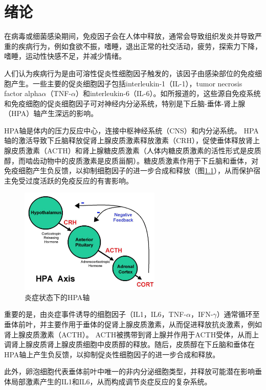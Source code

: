 
\chapter{绪论}
  在病毒或细菌感染期间，免疫因子会在人体中释放，通常会导致组织发炎并导致严重的疾病行为，例如食欲不振，嗜睡，退出正常的社交活动，疲劳，探索力下降，嗜睡，运动性快感不足，并减少情绪。

  人们认为疾病行为是由可溶性促炎性细胞因子触发的，该因子由感染部位的免疫细胞产生。一些主要的促炎细胞因子包括interleukin-1（IL-1），tumor necrosis factor alpha$\alpha$（TNF-$\alpha$）和interleukin-6（IL-6）。如所报道的，这些源自免疫系统和免疫细胞的促炎细胞因子可对神经内分泌系统，特别是下丘脑-垂体-肾上腺（HPA）轴产生深远的影响。

  HPA轴是体内的压力反应中心，连接中枢神经系统（CNS）和内分泌系统。 HPA轴的激活导致下丘脑释放促肾上腺皮质激素释放激素（CRH），促使垂体释放肾上腺皮质激素（ACTH）和肾上腺糖皮质激素（人体内糖皮质激素的活性形式是皮质醇，而啮齿动物中的皮质激素是皮质甾酮）。糖皮质激素作用于下丘脑和垂体，对免疫细胞产生负反馈，以抑制细胞因子的进一步合成和释放（图\ref{fig:HPA}），从而保护宿主免受过度活跃的免疫反应的有害影响。

\begin{figure}[!htb]
  \centering
  \includegraphics[width=0.6\textwidth]{figs/HPA.png}
  \caption{炎症状态下的HPA轴}
  \label{fig:HPA}
\end{figure}

  重要的是，由炎症事件诱导的细胞因子（IL1，IL6，TNF-$\alpha$，IFN-$\gamma$）通常循环至垂体前叶，并主要作用于垂体的促肾上腺皮质激素，从而促进释放抗炎激素，例如肾上腺皮质激素（ACTH）。 ACTH被携带到肾上腺并作用于ACTH受体，从而上调肾上腺皮质肾上腺皮质细胞中皮质醇的释放。随后，皮质醇在下丘脑和垂体在HPA轴上产生负反馈，以抑制促炎性细胞因子的进一步合成和释放。

  此外，卵泡细胞代表垂体前叶中唯一的非内分泌细胞类型，并释放可能潜在影响垂体局部激素产生的IL1和IL6，从而构成调节炎症反应的复杂系统。

